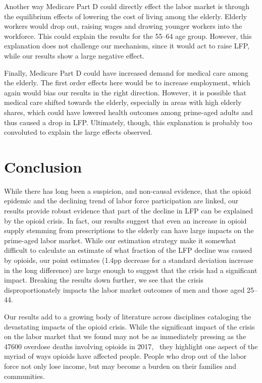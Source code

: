 \documentclass[12pt]{article}
\begin{document}
Another way Medicare Part D could directly effect the labor market is through the equilibrium effects of lowering the cost of living among the elderly.  Elderly workers would drop out, raising wages and drawing younger workers into the workforce.  This could explain the results for the 55--64 age group.  However, this explanation does not challenge our mechanism, since it would act to raise LFP, while our results show a large negative effect.

Finally, Medicare Part D could have increased demand for medical care among the elderly.  The first order effects here would be to increase employment, which again would bias our results in the right direction.  However, it is possible that medical care shifted towards the elderly, especially in areas with high elderly shares, which could have lowered health outcomes among prime-aged adults and thus caused a drop in LFP\@.  Ultimately, though, this explanation is probably too convoluted to explain the large effects observed.


\section{Conclusion} \label{conclusion}
While there has long been a suspicion, and non-causal evidence, that the opioid epidemic and the declining trend of labor force participation are linked, our results provide robust evidence that part of the decline in LFP can be explained by the opioid crisis.  In fact, our results suggest that even an increase in opioid supply stemming from prescriptions to the elderly can have large impacts on the prime-aged labor market.  While our estimation strategy make it somewhat difficult to calculate an estimate of what fraction of the LFP decline was caused by opioids, our point estimates (1.4pp decrease for a standard deviation increase in the long difference) are large enough to suggest that the crisis had a significant impact.  Breaking the results down further, we see that the crisis disproportionately impacts the labor market outcomes of men and those aged 25--44.  

Our results add to a growing body of literature across disciplines cataloging the devastating impacts of the opioid crisis.  While the significant impact of the crisis on the labor market that we found may not be as immediately pressing as the \num{47600} overdose deaths involving opioids in 2017,~ they highlight one aspect of the myriad of ways opioids have affected people.  People who drop out of the labor force not only lose income, but may become a burden on their families and communities.
\end{document}
